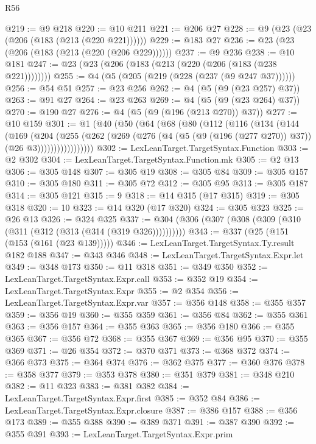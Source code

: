 \begin{lexlean}{R56}
\begin{coremodule}
@219 := @9 @218
@220 := @10 @211
@221 := @206 @27
@228 := @9 (@23 (@23 (@206 (@183 (@213 (@220 @221))))))
@229 := @183 @27
@236 := @23 (@23 (@206 (@183 (@213 (@220 (@206 @229))))))
@237 := @9 @236
@238 := @10 @181
@247 := @23 (@23 (@206 (@183 (@213 (@220 (@206 (@183 (@238 @221))))))))
@255 := @4 (@5 (@205 (@219 (@228 (@237 (@9 @247 @37))))))
@256 := @54 @51
@257 := @23 @256
@262 := @4 (@5 (@9 (@23 @257) @37))
@263 := @91 @27
@264 := @23 @263
@269 := @4 (@5 (@9 (@23 @264) @37))
@270 := @190 @27
@276 := @4 (@5 (@9 (@196 (@213 @270)) @37))
@277 := @10 @159
@301 := @1
    (@40
      (@50
        (@64
          (@68
            (@80
              (@112
                (@116
                  (@134
                    (@144
                      (@169
                        (@204
                          (@255
                            (@262
                              (@269
                                (@276 (@4 (@5 (@9 (@196 (@277 @270)) @37)) (@26 @3)))))))))))))))))
@302 := LexLeanTarget.TargetSyntax.Function
@303 := @2 @302
@304 := LexLeanTarget.TargetSyntax.Function.mk
@305 := @2 @13
@306 := @305 @148
@307 := @305 @19
@308 := @305 @84
@309 := @305 @157
@310 := @305 @180
@311 := @305 @72
@312 := @305 @95
@313 := @305 @187
@314 := @305 @121
@315 := 9
@318 := @14 @315 (@17 @315)
@319 := @305 @318
@320 := 10
@323 := @14 @320 (@17 @320)
@324 := @305 @323
@325 := @26 @13
@326 := @324 @325
@337 := @304 (@306 (@307 (@308 (@309 (@310 (@311 (@312 (@313 (@314 (@319 @326))))))))))
@343 := @337 (@25 (@151 (@153 (@161 (@23 @139)))))
@346 := LexLeanTarget.TargetSyntax.Ty.result @182 @188
@347 := @343 @346
@348 := LexLeanTarget.TargetSyntax.Expr.let
@349 := @348 @173
@350 := @11 @318
@351 := @349 @350
@352 := LexLeanTarget.TargetSyntax.Expr.call
@353 := @352 @19
@354 := LexLeanTarget.TargetSyntax.Expr
@355 := @2 @354
@356 := LexLeanTarget.TargetSyntax.Expr.var
@357 := @356 @148
@358 := @355 @357
@359 := @356 @19
@360 := @355 @359
@361 := @356 @84
@362 := @355 @361
@363 := @356 @157
@364 := @355 @363
@365 := @356 @180
@366 := @355 @365
@367 := @356 @72
@368 := @355 @367
@369 := @356 @95
@370 := @355 @369
@371 := @26 @354
@372 := @370 @371
@373 := @368 @372
@374 := @366 @373
@375 := @364 @374
@376 := @362 @375
@377 := @360 @376
@378 := @358 @377
@379 := @353 @378
@380 := @351 @379
@381 := @348 @210
@382 := @11 @323
@383 := @381 @382
@384 := LexLeanTarget.TargetSyntax.Expr.first
@385 := @352 @84
@386 := LexLeanTarget.TargetSyntax.Expr.closure
@387 := @386 @157
@388 := @356 @173
@389 := @355 @388
@390 := @389 @371
@391 := @387 @390
@392 := @355 @391
@393 := LexLeanTarget.TargetSyntax.Expr.prim

\end{coremodule}
\end{lexlean}
